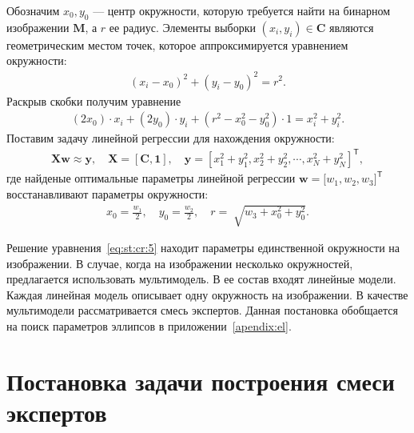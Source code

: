 \documentclass[12pt, twoside]{article}
\numberwithin{equation}{section}
\begin{document}
Обозначим $x_0, y_0$ --- центр окружности, которую требуется найти на бинарном изображении $\textbf{M}$, а $r$ ее радиус. Элементы выборки $\left(x_i, y_i\right)\in\textbf{C}$ являются геометрическим местом точек, которое аппроксимируется уравнением окружности:
\begin{equation}
\label{eq:st:cr:3}
\begin{aligned}
\left(x_i - x_0\right)^{2}+\left(y_i-y_0\right)^2 = r^2.
\end{aligned}
\end{equation}
Раскрыв скобки получим уравнение
\begin{equation}
\label{eq:st:cr:4}
\begin{aligned}
(2x_0)\cdot x_i + (2y_0)\cdot y_i+(r^2-x_0^2-y_0^2)\cdot1 = x_{i}^2 + y_{i}^2.
\end{aligned}
\end{equation}
Поставим задачу линейной регрессии для нахождения окружности:
\begin{equation}
\label{eq:st:cr:5}
\begin{aligned}
\textbf{X}\textbf{w} \approx \textbf{y},  \quad \textbf{X} = \left[\textbf{C}, \textbf{1}\right], \quad \textbf{y} = [x_1^2+y_1^2, x_2^2+y_2^2, \cdots, x_N^2+y_N^2]^{\mathsf{T}},
\end{aligned}
\end{equation}
где найденые оптимальные параметры линейной регрессии $\textbf{w} = \bigr[w_1, w_2, w_3\bigr]^{\mathsf{T}}$ восстанавливают параметры окружности:
\begin{equation}
\label{eq:st:cr:6}
\begin{aligned}
x_0 = \frac{w_1}{2}, \quad y_0 = \frac{w_2}{2}, \quad r = \sqrt[]{w_3+x_{0}^{2}+y_{0}^{2}}.
\end{aligned}
\end{equation}

Решение уравнения~\eqref{eq:st:cr:5} находит параметры единственной окружности на изображении. В случае, когда на изображении несколько окружностей, предлагается использовать мультимодель. В ее состав входят линейные модели. Каждая линейная модель описывает одну окружность на изображении. В качестве мультимодели рассматривается смесь экспертов. Данная постановка обобщается на поиск параметров эллипсов в приложении~\eqref{apendix:el}.

\section{Постановка задачи построения смеси экспертов}
\end{document}
